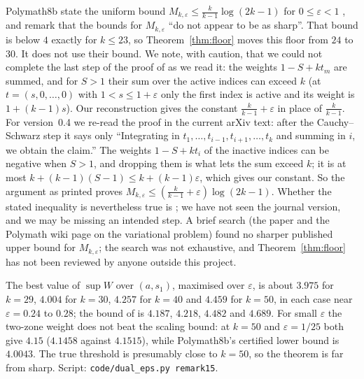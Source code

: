 \begin{remark}
Polymath8b state the uniform bound $M_{k,\varepsilon}\le\frac{k}{k-1}\log(2k-1)$
for $0\le\varepsilon<1$ \cite[Prop.~6.5]{Pol14b}, and remark that the bounds
for $M_{k,\varepsilon}$ ``do not appear to be as sharp''. That bound is below
$4$ exactly for $k\le23$, so Theorem~\ref{thm:floor} moves this floor from $24$
to $30$. It does not use their bound. We note, with caution, that we could not
complete the last step of the proof of \cite[Prop.~6.5]{Pol14b} as we read it:
the weights $1-S+kt_m$ are summed, and for $S>1$ their sum over the active
indices can exceed $k$ (at $t=(s,0,\dots,0)$ with $1<s\le1+\varepsilon$ only
the first index is active and its weight is $1+(k-1)s$). Our reconstruction
gives the constant $\frac{k}{k-1}+\varepsilon$ in place of $\frac{k}{k-1}$. For
version~0.4 we re-read the proof in the current arXiv text: after the
Cauchy--Schwarz step it says only ``Integrating in $t_1,\dots,t_{i-1},
t_{i+1},\dots,t_k$ and summing in $i$, we obtain the claim.'' The weights
$1-S+kt_i$ of the inactive indices can be negative when $S>1$, and dropping
them is what lets the sum exceed $k$; it is at most
$k+(k-1)(S-1)\le k+(k-1)\varepsilon$, which gives our constant. So the
argument as printed proves $M_{k,\varepsilon}\le\left(\frac{k}{k-1}+\varepsilon\right)\log(2k-1)$.
Whether the stated inequality is nevertheless true is ; we have not
seen the journal version, and we may be missing an intended step. A
brief search (the paper \cite{Pol14b} and the Polymath wiki page on the
variational problem) found no sharper published upper bound for
$M_{k,\varepsilon}$; the search was not exhaustive, and
Theorem~\ref{thm:floor} has not been reviewed by anyone outside this project.
\end{remark}

\begin{remark}
The best value of $\sup W$ over $(a,s_1)$, maximised over $\varepsilon$, is
about $3.975$ for $k=29$, $4.004$ for $k=30$, $4.257$ for $k=40$ and $4.459$
for $k=50$, in each case near $\varepsilon=0.24$ to $0.28$; the bound of
\cite[Prop.~6.5]{Pol14b} is $4.187$, $4.218$, $4.482$ and $4.689$. For small
$\varepsilon$ the two-zone weight does not beat the scaling bound: at $k=50$
and $\varepsilon=1/25$ both give $4.15$ ($4.1458$ against $4.1515$), while
Polymath8b's certified lower bound is $4.0043$. The true threshold is presumably
close to $k=50$, so the theorem is far from sharp. Script:
\texttt{code/dual\_eps.py remark15}.
\end{remark}


